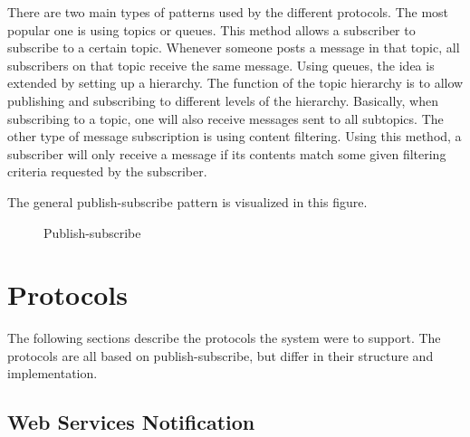There are two main types of patterns used by the different protocols. The most popular one is using topics or queues. This method allows a subscriber to subscribe to a certain topic. Whenever someone posts a message in that topic, all subscribers on that topic receive the same message. Using queues, the idea is extended by setting up a hierarchy. The function of the topic hierarchy is to allow publishing and subscribing to different levels of the hierarchy. Basically, when subscribing to a topic, one will also receive messages sent to all subtopics. The other type of message subscription is using content filtering. Using this method, a subscriber will only receive a message if its contents match some given filtering criteria requested by the subscriber.

The general publish-subscribe pattern is visualized in this figure.

\begin{center}
  \begin{figure}[ht]
    \caption{Publish-subscribe}
    \label{fig:publish-subscribe}
  \end{figure}
\end{center}

\section{Protocols}
\label{prestudies-protocols}

The following sections describe the protocols the system were to support. The protocols are all based on publish-subscribe, but differ in their structure and implementation.

\subsection{Web Services Notification}
\label{subsec:prestudies-wsnotification}

